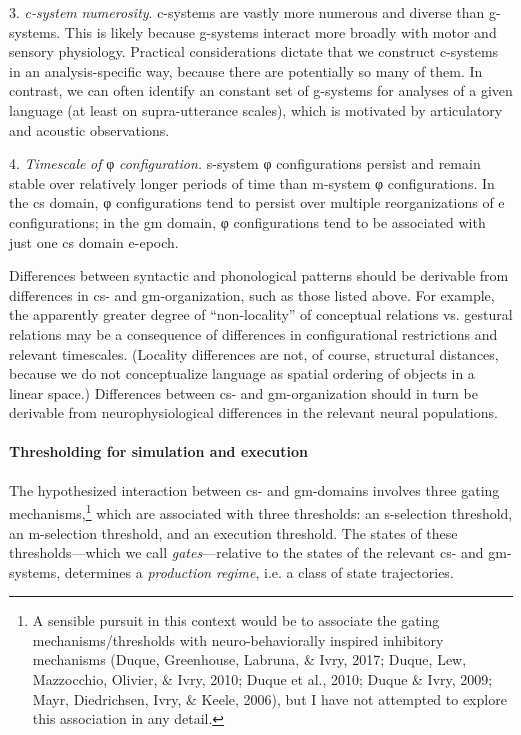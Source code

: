 3. \textit{c-system} \textit{numerosity}. c-systems are vastly more numerous and diverse than g-systems. This is likely because g-systems interact more broadly with motor and sensory physiology. Practical considerations dictate that we construct c-systems in an analysis-specific way, because there are potentially so many of them. In contrast, we can often identify an constant set of g-systems for analyses of a given language (at least on supra-utterance scales), which is motivated  by articulatory and acoustic observations.

4. \textit{Timescale} \textit{of} φ \textit{configuration.} s-system φ configurations persist and remain stable over relatively longer periods of time than m-system φ configurations. In the cs domain, φ configurations tend to persist over multiple reorganizations of e configurations; in the gm domain, φ configurations tend to be associated with just one cs domain e-epoch.

  Differences between syntactic and phonological patterns should be derivable from differences in cs- and gm-organization, such as those listed above. For example, the apparently greater degree of “non-locality” of conceptual relations vs. gestural relations may be a consequence of differences in configurational restrictions and relevant timescales. (Locality differences are not, of course, structural distances, because we do not conceptualize language as spatial ordering of objects in a linear space.) Differences between cs- and gm-organization should in turn be derivable from neurophysiological differences in the relevant neural populations.

\paragraph{Thresholding for simulation and execution}

The hypothesized interaction between cs- and gm-domains involves three gating mechanisms,\footnote{A sensible pursuit in this context would be to associate the gating mechanisms/thresholds with neuro-behaviorally inspired inhibitory mechanisms (Duque, Greenhouse, Labruna, \& Ivry, 2017; Duque, Lew, Mazzocchio, Olivier, \& Ivry, 2010; Duque et al., 2010; Duque \& Ivry, 2009; Mayr, Diedrichsen, Ivry, \& Keele, 2006), but I have not attempted to explore this association in any detail.} which are associated with three thresholds: an s-selection threshold, an m-selection threshold, and an execution threshold. The states of these thresholds—which we call \textit{gates}—relative to the states of the relevant cs- and gm-systems, determines a \textit{production} \textit{regime}, i.e. a class of state trajectories. 

